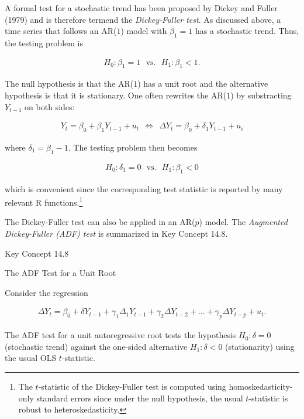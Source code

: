\documentclass[]{book}
\let\rmarkdownfootnote\footnote%
\def\footnote{\protect\rmarkdownfootnote}
\theoremstyle{definition}
\theoremstyle{definition}
\theoremstyle{definition}
\theoremstyle{remark}
\begin{document}
A formal test for a stochastic trend has been proposed by Dickey and
Fuller (1979) and is therefore termend the \emph{Dickey-Fuller test}. As
discussed above, a time series that follows an AR(\(1\)) model with
\(\beta_1 = 1\) has a stochastic trend. Thus, the testing problem is

\begin{align*}
  H_0: \beta_1 = 1 \ \ \ \text{vs.} \ \ \ H_1: \beta_1 < 1.
\end{align*}

The null hypothesis is that the AR(\(1\)) has a unit root and the
alternative hypothesis is that it is stationary. One often rewrites the
AR(\(1\)) by substracting \(Y_{t-1}\) on both sides:

\begin{align*}
  Y_t = \beta_0 + \beta_1 Y_{t-1} + u_t \ \ \Leftrightarrow \ \ \Delta Y_t = \beta_0 + \delta_1 Y_{t-1} + u_i
\end{align*}

where \(\delta_1 = \beta_1 - 1\). The testing problem then becomes

\begin{align*}
  H_0: \delta_1 = 0 \ \ \ \text{vs.} \ \ \ H_1: \beta_1 < 0
\end{align*}

which is convenient since the corresponding test statistic is reported
by many relevant R functions.\footnote{The \(t\)-statistic of the
  Dickey-Fuller test is computed using homoskedasticity-only standard
  errors since under the null hypothesis, the usual \(t\)-statistic is
  robust to heteroskedasticity.}

The Dickey-Fuller test can also be applied in an AR(\(p\)) model. The
\emph{Augmented Dickey-Fuller (ADF) test} is summarized in Key Concept
14.8.

Key Concept 14.8

The ADF Test for a Unit Root

Consider the regression

\begin{align}
  \Delta Y_t = \beta_0 + \delta Y_{t-1} + \gamma_1 \Delta_1 Y_{t-1} + \gamma_2 \Delta Y_{t-2} + \dots + \gamma_p \Delta Y_{t-p} + u_t. \label{eq:ADFreg1}
\end{align}

The ADF test for a unit autoregressive root tests the hypothesis
\(H_0: \delta = 0\) (stochastic trend) against the one-sided alternative
\(H_1: \delta < 0\) (stationarity) using the usual OLS \(t\)-statistic.
\end{document}
